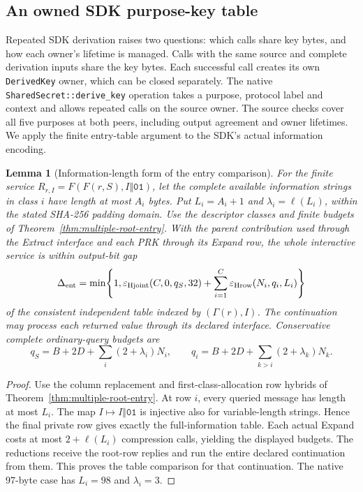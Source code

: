 \documentclass[pdflatex]{sn-jnl}
\theoremstyle{thmstyleone}
\newtheorem{lemma}[theorem]{Lemma}
\theoremstyle{thmstylethree}
\theoremstyle{thmstyletwo}
\begin{document}
\subsection{An owned SDK purpose-key table}
\label{sec:sdk-purpose-connection}

Repeated SDK derivation raises two questions: which calls share key
bytes, and how each owner's lifetime is managed. Calls with the
same source and complete derivation inputs share the key bytes. Each
successful call creates its own \texttt{DerivedKey} owner, which can be
closed separately. The native
\texttt{SharedSecret::derive\_key} operation takes a purpose, protocol
label and context and allows repeated calls on the source owner. The
source checks cover all five purposes at both peers, including output
agreement and owner lifetimes. We apply the finite entry-table
argument to the SDK's actual information encoding.

\begin{lemma}[Information-length form of the entry comparison]
\label{lem:entry-information-length}
For the finite service $R_{r,I}=F(F(r,S),I\Vert\mathtt{01})$, let the
complete available information strings in class $i$ have length at most
$A_i$ bytes. Put $L_i=A_i+1$ and $\lambda_i=\ell(L_i)$, within the stated
SHA-256 padding domain. Use the descriptor classes and finite budgets of
Theorem~\ref{thm:multiple-root-entry}. With the parent contribution used
through the Extract interface and each PRK through its Expand row, the
whole interactive service is within output-bit gap
\begin{equation}
 \Delta_{\rm ent}=\min\!\left\{1,
 \varepsilon_{\rm Hjoint}(C,0,q_S,32)
 +\sum_{i=1}^{C}\varepsilon_{\rm Hrow}(N_i,q_i,L_i)\right\}
 \label{eq:entry-information-length}
\end{equation}
of the consistent independent table indexed by $(\Gamma(r),I)$.
The continuation may process each returned value through its declared
interface. Conservative complete ordinary-query budgets are
\[
 q_S=B+2D+\sum_i(2+\lambda_i)N_i,\qquad
 q_i=B+2D+\sum_{k>i}(2+\lambda_k)N_k.
\]
\end{lemma}
\begin{proof}
Use the column replacement and first-class-allocation row hybrids of
Theorem~\ref{thm:multiple-root-entry}. At row $i$, every queried message
has length at most $L_i$. The map $I\mapsto I\Vert\mathtt{01}$ is injective
also for variable-length strings. Hence the final private row gives exactly
the full-information table. Each actual Expand costs at most
$2+\ell(L_i)$ compression calls, yielding the displayed budgets.
The reductions receive the root-row replies and run the entire declared
continuation from them. This proves the table comparison for that
continuation. The native 97-byte case has $L_i=98$ and $\lambda_i=3$.
\end{proof}
\end{document}
